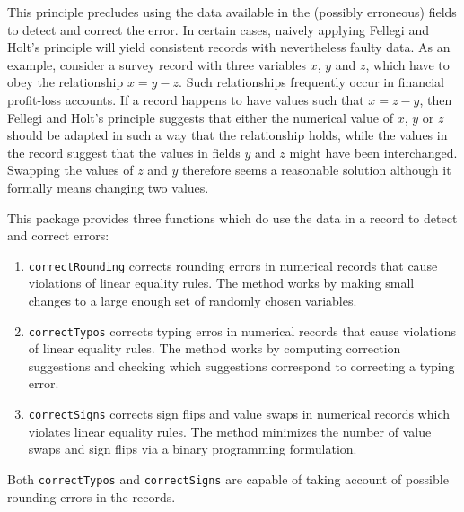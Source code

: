 \documentclass[11pt, fleqn, a4paper]{article}
\begin{document}
This principle precludes using the data available in the (possibly erroneous)
fields to detect and correct the error. In certain cases, naively applying
Fellegi and Holt's principle will yield consistent records with nevertheless
faulty data. As an example, consider a survey record with three variables $x$,
$y$ and $z$, which have to obey the relationship $x=y-z$. Such relationships
frequently occur in financial profit-loss accounts. If a record happens to have
values such that $x=z-y$, then Fellegi and Holt's principle suggests that
either the numerical value of $x$, $y$ or $z$ should be adapted in such a way
that the relationship holds, while the values in the record suggest that the
values in fields $y$ and $z$ might have been interchanged. Swapping the values
of $z$ and $y$ therefore seems a reasonable solution although it formally means
changing two values.

This package provides three functions which do use the data in a record to 
detect and correct errors:
\begin{enumerate}
\item {\tt correctRounding} corrects rounding errors in numerical records that cause 
    violations of linear equality rules. The method works by making small changes
    to a large enough set of randomly chosen variables.
\item {\tt correctTypos} corrects typing erros in numerical records that cause violations
    of linear equality rules. The method works by computing correction suggestions and
    checking which suggestions correspond to correcting a typing error. 
\item {\tt correctSigns} corrects sign flips and value swaps in numerical records which
    violates linear equality rules. The method minimizes the number of value swaps and
    sign flips via a binary programming formulation.
\end{enumerate}
Both {\tt correctTypos} and {\tt correctSigns} are capable of taking account of possible 
rounding errors in the records.
\end{document}
